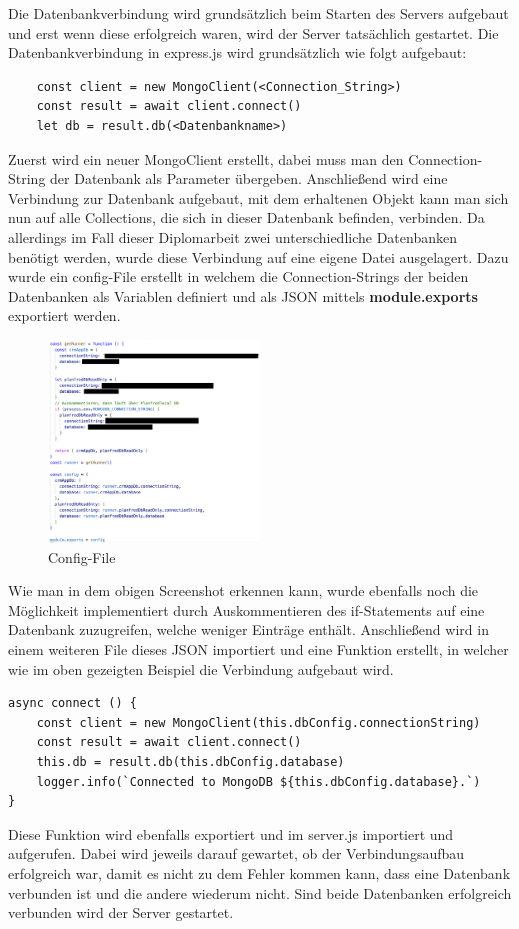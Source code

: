 Die Datenbankverbindung wird grundsätzlich beim Starten des Servers aufgebaut und erst wenn diese erfolgreich waren, wird der Server tatsächlich gestartet. Die Datenbankverbindung in express.js wird grundsätzlich wie folgt aufgebaut:
\newline
\begin{lstlisting}
    const client = new MongoClient(<Connection_String>)
    const result = await client.connect()
    let db = result.db(<Datenbankname>)
\end{lstlisting}
Zuerst wird ein neuer MongoClient erstellt, dabei muss man den Connection-String der Datenbank als Parameter übergeben. Anschließend wird eine Verbindung zur Datenbank aufgebaut, mit dem erhaltenen Objekt kann man sich nun auf alle Collections, die sich in dieser Datenbank befinden, verbinden. Da allerdings im Fall dieser Diplomarbeit zwei unterschiedliche Datenbanken benötigt werden, wurde diese Verbindung auf eine eigene Datei ausgelagert.
\newline
Dazu wurde ein config-File erstellt in welchem die Connection-Strings der beiden Datenbanken als Variablen definiert und als JSON mittels \textbf{module.exports} exportiert werden.
\begin{figure}[h!]
    \centering
    \includegraphics[width=0.5\textwidth]{pics/config-file-conn-strings.png}
    \caption{Config-File}
    \label{fig:enter-label}
\end{figure}
Wie man in dem obigen Screenshot erkennen kann, wurde ebenfalls noch die Möglichkeit implementiert durch Auskommentieren des if-Statements auf eine Datenbank zuzugreifen, welche weniger Einträge enthält.
\newline
Anschließend wird in einem weiteren File dieses JSON importiert und eine Funktion erstellt, in welcher wie im oben gezeigten Beispiel die Verbindung aufgebaut wird.
\begin{lstlisting}
async connect () {
    const client = new MongoClient(this.dbConfig.connectionString)
    const result = await client.connect()
    this.db = result.db(this.dbConfig.database)
    logger.info(`Connected to MongoDB ${this.dbConfig.database}.`)
}
\end{lstlisting}
Diese Funktion wird ebenfalls exportiert und im server.js importiert und aufgerufen. Dabei wird jeweils darauf gewartet, ob der Verbindungsaufbau erfolgreich war, damit es nicht zu dem Fehler kommen kann, dass eine Datenbank verbunden ist und die andere wiederum nicht. Sind beide Datenbanken erfolgreich verbunden wird der Server gestartet.